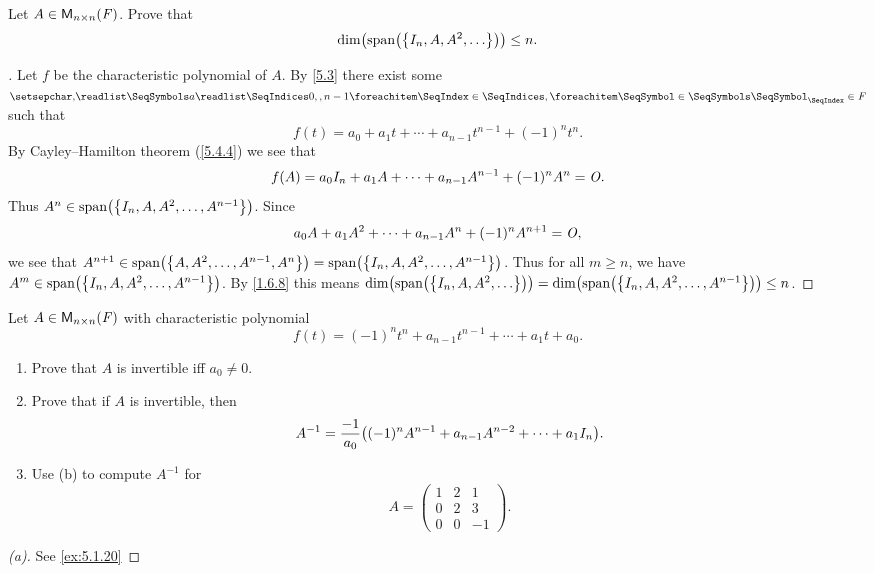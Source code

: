 \begin{ex}\label{ex:5.4.17}
  Let \(A \in \mathsf{M}_{{n} \times n}({\mathit{F}})\).
  Prove that
  \[
    \dim\pa{\spn{\set{I_n, A, A^2, \dots}}} \leq n.
  \]
\end{ex}

\begin{proof}[]
  Let \(f\) be the characteristic polynomial of \(A\).
  By \cref{5.3} there exist some \(\seq{a}{0,,n-1} \in \F\) such that
  \[
    f(t) = a_0 + a_1 t + \cdots + a_{n - 1} t^{n - 1} + (-1)^n t^n.
  \]
  By Cayley--Hamilton theorem (\cref{5.4.4}) we see that
  \[
    f(A) = a_0 I_n + a_1 A + \cdots + a_{n - 1} A^{n - 1} + (-1)^n A^n = \mathit{O}.
  \]
  Thus \(A^n \in \spn{\set{I_n, A, A^2, \dots, A^{n - 1}}}\).
  Since
  \[
    a_0 A + a_1 A^2 + \cdots + a_{n - 1} A^n + (-1)^n A^{n + 1} = \mathit{O},
  \]
  we see that \(A^{n + 1} \in \spn{\set{A, A^2, \dots, A^{n - 1}, A^n}} = \spn{\set{I_n, A, A^2, \dots, A^{n - 1}}}\).
  Thus for all \(m \geq n\), we have \(A^m \in \spn{\set{I_n, A, A^2, \dots, A^{n - 1}}}\).
  By \cref{1.6.8} this means \(\dim\pa{\spn{\set{I_n, A, A^2, \dots}}} = \dim\pa{\spn{\set{I_n, A, A^2, \dots, A^{n - 1}}}} \leq n\).
\end{proof}

\begin{ex}\label{ex:5.4.18}
  Let \(A \in \mathsf{M}_{{n} \times n}({\mathit{F}})\) with characteristic polynomial
  \[
    f(t) = (-1)^n t^n + a_{n - 1} t^{n - 1} + \cdots + a_1 t + a_0.
  \]
  \begin{enumerate}
    \item Prove that \(A\) is invertible iff \(a_0 \neq 0\).
    \item Prove that if \(A\) is invertible, then
          \[
            A^{-1} = \frac{-1}{a_0} \pa{(-1)^n A^{n - 1} + a_{n - 1} A^{n - 2} + \cdots + a_1 I_n}.
          \]
    \item Use (b) to compute \(A^{-1}\) for
          \[
            A = \begin{pmatrix}
              1 & 2 & 1  \\
              0 & 2 & 3  \\
              0 & 0 & -1
            \end{pmatrix}.
          \]
  \end{enumerate}
\end{ex}

\begin{proof}[(a)]
  See \cref{ex:5.1.20}
\end{proof}

